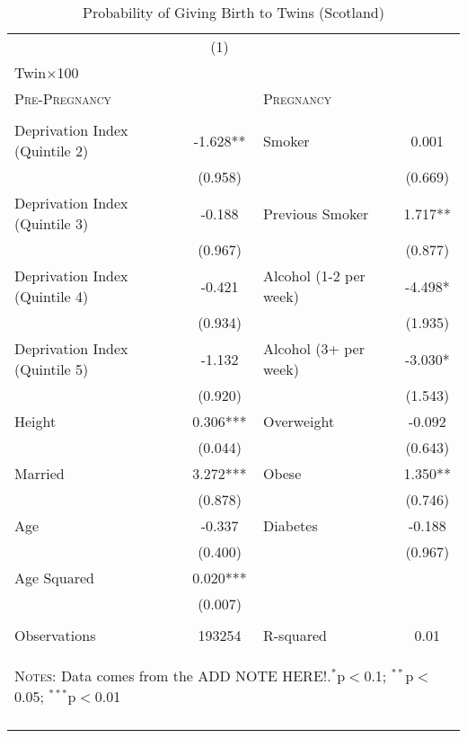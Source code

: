 \begin{table}[htpb!] 
\caption{Probability of Giving Birth to Twins (Scotland)} 
\label{TWINtab:Scotland} 
\begin{center}\begin{tabular}{lclc} \toprule \toprule 
&(1)&&\\
Twin$\times$100&&&\\\midrule
\multicolumn{2}{l}{\textsc{Pre-Pregnancy}}&\multicolumn{2}{l}{\textsc{Pregnancy}}\\\begin{footnotesize}\end{footnotesize}&\begin{footnotesize}\end{footnotesize}&\begin{footnotesize}\end{footnotesize}&\begin{footnotesize}\end{footnotesize}\\
Deprivation Index (Quintile 2)&-1.628**
&Smoker&0.001
\\
&(0.958)
&&(0.669)
\\
Deprivation Index (Quintile 3)&-0.188
&Previous Smoker&1.717**
\\
&(0.967)
&&(0.877)
\\
Deprivation Index (Quintile 4)&-0.421
&Alcohol (1-2 per week)&-4.498*
\\
&(0.934)
&&(1.935)
\\
Deprivation Index (Quintile 5)&-1.132
&Alcohol (3+ per week)&-3.030*
\\
&(0.920)
&&(1.543)
\\
Height&0.306***
&Overweight&-0.092
\\
&(0.044)
&&(0.643)
\\
Married&3.272***
&Obese&1.350**
\\
&(0.878)
&&(0.746)
\\
Age&-0.337
&Diabetes&-0.188
\\
&(0.400)
&&(0.967)
\\
Age Squared&0.020***
&&\\
&(0.007)
&&\\
&&&\\
Observations&193254
&R-squared&0.01\\
\midrule\multicolumn{4}{p{11cm}}{\begin{footnotesize}\textsc{Notes:} Data comes from the ADD NOTE HERE!.$^{*}$p$<$0.1; $^{**}$p$<$0.05; $^{***}$p$<$0.01\end{footnotesize}}\\ \hline \normalsize \end{tabular}\end{center}\end{table}
